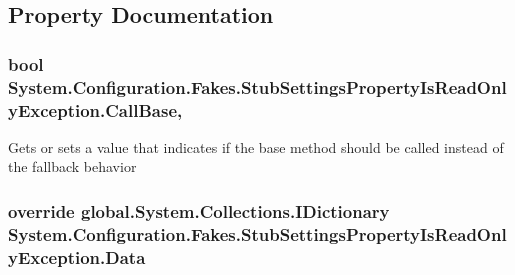 \subsection{Property Documentation}
\hypertarget{class_system_1_1_configuration_1_1_fakes_1_1_stub_settings_property_is_read_only_exception_a20dcd677107719f4c221a57049e3d7d8}{
\subsubsection[{Call\-Base}]{\setlength{\rightskip}{0pt plus 5cm}bool System.\-Configuration.\-Fakes.\-Stub\-Settings\-Property\-Is\-Read\-Only\-Exception.\-Call\-Base\hspace{0.3cm}{\ttfamily [get]}, {\ttfamily [set]}}}\label{class_system_1_1_configuration_1_1_fakes_1_1_stub_settings_property_is_read_only_exception_a20dcd677107719f4c221a57049e3d7d8}


Gets or sets a value that indicates if the base method should be called instead of the fallback behavior

\hypertarget{class_system_1_1_configuration_1_1_fakes_1_1_stub_settings_property_is_read_only_exception_a222174728dc9fca8ddd3dd93d5d1d0a4}{
\subsubsection[{Data}]{\setlength{\rightskip}{0pt plus 5cm}override global.\-System.\-Collections.\-I\-Dictionary System.\-Configuration.\-Fakes.\-Stub\-Settings\-Property\-Is\-Read\-Only\-Exception.\-Data\hspace{0.3cm}{\ttfamily [get]}}}\label{class_system_1_1_configuration_1_1_fakes_1_1_stub_settings_property_is_read_only_exception_a222174728dc9fca8ddd3dd93d5d1d0a4}


